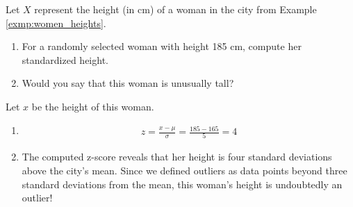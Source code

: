 \begin{exmp}
    Let \( X \) represent the height (in cm) of a woman in the city from Example \autoref{exmp:women_heights}.
    \begin{enumerate}
        \item For a randomly selected woman with height 185 cm, compute her standardized height.
        \item Would you say that this woman is unusually tall?
    \end{enumerate}
\end{exmp}
\begin{solution}
    Let \( x \) be the height of this woman.
    \begin{enumerate}
        \item \begin{gather*}
            z = \frac{x - \mu}{\sigma} = \frac{185 - 165}{5} = 4
        \end{gather*}
        \item The computed z-score reveals that her height is four standard deviations above the city's mean.
        Since we defined outliers as data points beyond three standard deviations from the mean,
        this woman's height is undoubtedly an outlier!
    \end{enumerate}
\end{solution}